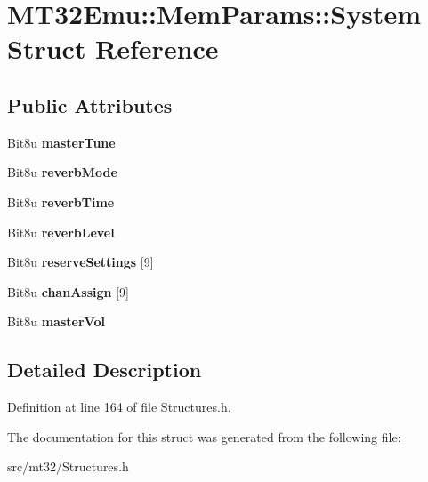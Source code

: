 \hypertarget{structMT32Emu_1_1MemParams_1_1System}{\section{M\-T32\-Emu\-:\-:Mem\-Params\-:\-:System Struct Reference}
\label{structMT32Emu_1_1MemParams_1_1System}
}
\subsection*{Public Attributes}
\begin{DoxyCompactItemize}
\item 
\hypertarget{structMT32Emu_1_1MemParams_1_1System_a507f42d9f5e23e79c03f8a8a0dc2f26f}{Bit8u {\bfseries master\-Tune}}\label{structMT32Emu_1_1MemParams_1_1System_a507f42d9f5e23e79c03f8a8a0dc2f26f}

\item 
\hypertarget{structMT32Emu_1_1MemParams_1_1System_a35ad428f19ad2445ac2a4fe03f98231f}{Bit8u {\bfseries reverb\-Mode}}\label{structMT32Emu_1_1MemParams_1_1System_a35ad428f19ad2445ac2a4fe03f98231f}

\item 
\hypertarget{structMT32Emu_1_1MemParams_1_1System_aa3322bf50fa8add6bd2effb525a38fa3}{Bit8u {\bfseries reverb\-Time}}\label{structMT32Emu_1_1MemParams_1_1System_aa3322bf50fa8add6bd2effb525a38fa3}

\item 
\hypertarget{structMT32Emu_1_1MemParams_1_1System_a27c6dec097af391fe808d5503d20fef3}{Bit8u {\bfseries reverb\-Level}}\label{structMT32Emu_1_1MemParams_1_1System_a27c6dec097af391fe808d5503d20fef3}

\item 
\hypertarget{structMT32Emu_1_1MemParams_1_1System_a7690a8fb1e781d61c7ea45bea8a1e51a}{Bit8u {\bfseries reserve\-Settings} \mbox{[}9\mbox{]}}\label{structMT32Emu_1_1MemParams_1_1System_a7690a8fb1e781d61c7ea45bea8a1e51a}

\item 
\hypertarget{structMT32Emu_1_1MemParams_1_1System_a99cc225784ecbe48b300bf461496a30e}{Bit8u {\bfseries chan\-Assign} \mbox{[}9\mbox{]}}\label{structMT32Emu_1_1MemParams_1_1System_a99cc225784ecbe48b300bf461496a30e}

\item 
\hypertarget{structMT32Emu_1_1MemParams_1_1System_ac3e47533ed014f7225b37ffa1a00f79f}{Bit8u {\bfseries master\-Vol}}\label{structMT32Emu_1_1MemParams_1_1System_ac3e47533ed014f7225b37ffa1a00f79f}

\end{DoxyCompactItemize}


\subsection{Detailed Description}


Definition at line 164 of file Structures.\-h.



The documentation for this struct was generated from the following file\-:\begin{DoxyCompactItemize}
\item 
src/mt32/Structures.\-h\end{DoxyCompactItemize}
